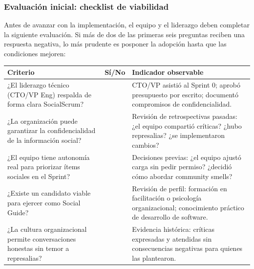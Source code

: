 \subsubsection{Evaluación inicial: checklist de viabilidad}

Antes de avanzar con la implementación, el equipo y el liderazgo deben completar la siguiente evaluación. Si más de dos de las primeras seis preguntas reciben una respuesta negativa, lo más prudente es posponer la adopción hasta que las condiciones mejoren:

\begin{table}[h]
    \centering
    \footnotesize
    \begin{tabularx}{\textwidth}{|X|c|X|}
        \hline
        \textbf{Criterio} & \textbf{Sí/No}                                                                                                              & \textbf{Indicador observable} \\
        \hline
        ¿El liderazgo técnico (CTO/VP Eng) respalda de forma clara SocialScrum?
                          &
                          & CTO/VP asistió al Sprint 0; aprobó presupuesto por escrito; documentó compromisos de confidencialidad.                                                      \\
        \hline
        ¿La organización puede garantizar la confidencialidad de la información social?
                          &
                          & Revisión de retrospectivas pasadas: ¿el equipo compartió críticas? ¿hubo represalias? ¿se implementaron cambios?                                            \\
        \hline
        ¿El equipo tiene autonomía real para priorizar ítems sociales en el Sprint?
                          &
                          & Decisiones previas: ¿el equipo ajustó carga sin pedir permiso? ¿decidió cómo abordar community smells?                                                      \\
        \hline
        ¿Existe un candidato viable para ejercer como Social Guide?
                          &
                          & Revisión de perfil: formación en facilitación o psicología organizacional; conocimiento práctico de desarrollo de software.                                 \\
        \hline
        ¿La cultura organizacional permite conversaciones honestas sin temor a represalias?
                          &
                          & Evidencia histórica: críticas expresadas y atendidas sin consecuencias negativas para quienes las plantearon.                                               \\

\end{tabularx}
\end{table}
